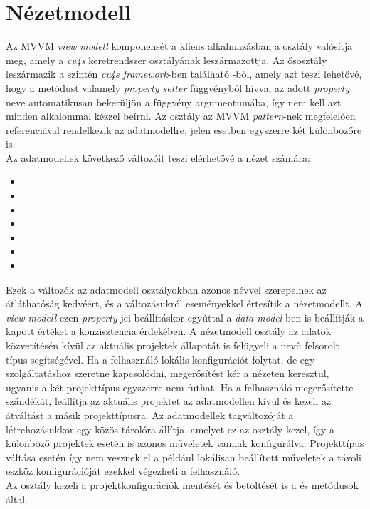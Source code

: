 \section{Nézetmodell}

Az MVVM \emph{view modell} komponensét a kliens alkalmazásban a  osztály valósítja meg, amely a \emph{cv4s} keretrendszer  osztályának leszármazottja. Az ősosztály leszármazik a szintén \emph{cv4s framework}-ben található -ből, amely azt teszi lehetővé, hogy a  metódust valamely \emph{property setter} függvényből hívva, az adott \emph{property} neve automatikusan bekerüljön a függvény argumentumába, így nem kell azt minden alkalommal kézzel beírni. Az osztály az MVVM \emph{pattern}-nek megfelelően referenciával rendelkezik az adatmodellre, jelen esetben egyszerre két különbözőre is.\\
Az adatmodellek következő változóit teszi elérhetővé a nézet számára:

 \begin{multicols}{2}
    \begin{itemize}
        \item {}
        \item {}
        \item {}
        \item {}
        \item {}
        \item {}
        \item {}
    \end{itemize}
\end{multicols}
    

Ezek a változók az adatmodell osztályokban azonos névvel szerepelnek az átláthatóság kedvéért, és a változásukról eseményekkel értesítik a nézetmodellt. A \emph{view modell} ezen \emph{property}-jei beállításkor egyúttal a \emph{data model}-ben is beállítják a kapott értéket a konzisztencia érdekében.
A nézetmodell osztály az adatok közvetítésén kívül az aktuális projektek állapotát is felügyeli a  nevű felsorolt típus segítségével. Ha a felhasználó lokális konfigurációt folytat, de egy szolgáltatáshoz szeretne kapcsolódni, megerősítést kér a nézeten keresztül, ugyanis a két projekttípus egyszerre nem futhat. Ha a felhasználó megerősítette szándékát, leállítja az aktuális projektet az adatmodellen kívül és kezeli az átváltást a másik projekttípusra. Az adatmodellek  tagváltozóját a létrehozásukkor egy közös tárolóra állítja, amelyet ez az osztály kezel, így a különböző projektek esetén is azonos műveletek vannak konfigurálva. Projekttípus váltása esetén így nem vesznek el a például lokálisan beállított műveletek a távoli eszköz konfigurációját ezekkel végezheti a felhasználó.\\
Az osztály kezeli a projektkonfigurációk mentését és betöltését is a  és  metódusok által.

